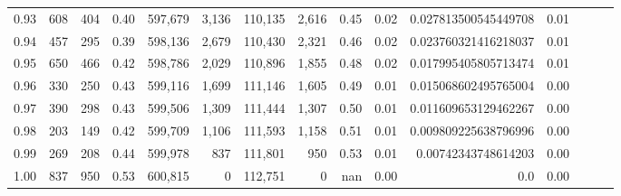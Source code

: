 \begin{tabular}{rrrrrrrrrrrrrrr}
0.93 &     608 &    404 &  0.40 &  597,679 &    3,136 &  110,135 &    2,616 &  0.45 &  0.02 &  0.027813500545449708 &      0.01 \\
0.94 &     457 &    295 &  0.39 &  598,136 &    2,679 &  110,430 &    2,321 &  0.46 &  0.02 &  0.023760321416218037 &      0.01 \\
0.95 &     650 &    466 &  0.42 &  598,786 &    2,029 &  110,896 &    1,855 &  0.48 &  0.02 &  0.017995405805713474 &      0.01 \\
0.96 &     330 &    250 &  0.43 &  599,116 &    1,699 &  111,146 &    1,605 &  0.49 &  0.01 &  0.015068602495765004 &      0.00 \\
0.97 &     390 &    298 &  0.43 &  599,506 &    1,309 &  111,444 &    1,307 &  0.50 &  0.01 &  0.011609653129462267 &      0.00 \\
0.98 &     203 &    149 &  0.42 &  599,709 &    1,106 &  111,593 &    1,158 &  0.51 &  0.01 &  0.009809225638796996 &      0.00 \\
0.99 &     269 &    208 &  0.44 &  599,978 &      837 &  111,801 &      950 &  0.53 &  0.01 &   0.00742343748614203 &      0.00 \\
1.00 &     837 &    950 &  0.53 &  600,815 &        0 &  112,751 &        0 &   nan &  0.00 &                   0.0 &      0.00 \\
\bottomrule
\end{tabular}
